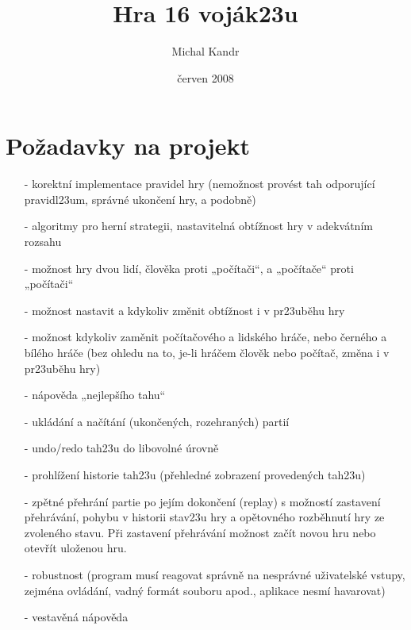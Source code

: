 \documentclass{article}
\title{Hra 16 voj\'ak\accent23u}
\author{Michal Kandr}
\date{\v{c}erven 2008}
\begin{document}
 \maketitle


\newpage



\section{Po\v{z}adavky na projekt}
\begin{enumerate}
	\item[-]korektn\'i implementace pravidel hry (nemo\v{z}nost prov\'est tah odporuj\'ic\'i pravidl\accent23um, spr\'avn\'e ukon\v{c}en\'i hry, a podobn\v{e})
	\item[-]algoritmy pro hern\'i strategii, nastaviteln\'a obt\'i\v{z}nost hry v adekv\'atn\'im rozsahu
	\item[-]mo\v{z}nost hry dvou lid\'i, \v{c}lov\v{e}ka proti „po\v{c}\'ita\v{c}i“, a „po\v{c}\'ita\v{c}e“ proti „po\v{c}\'ita\v{c}i“
	\item[-]mo\v{z}nost nastavit a kdykoliv zm\v{e}nit obt\'i\v{z}nost i v pr\accent23ub\v{e}hu hry
	\item[-]mo\v{z}nost kdykoliv zam\v{e}nit po\v{c}\'ita\v{c}ov\'eho a lidsk\'eho hr\'a\v{c}e, nebo \v{c}ern\'eho a b\'il\'eho hr\'a\v{c}e (bez ohledu na to, je-li hr\'a\v{c}em \v{c}lov\v{e}k nebo po\v{c}\'ita\v{c}, zm\v{e}na i v pr\accent23ub\v{e}hu hry)
	\item[-]n\'apov\v{e}da „nejlep\v{s}\'iho tahu“
	\item[-]ukl\'ad\'an\'i a na\v{c}\'it\'an\'i (ukon\v{c}en\'ych, rozehran\'ych) parti\'i
	\item[-]undo/redo tah\accent23u do libovoln\'e \'urovn\v{e}
	\item[-]prohl\'i\v{z}en\'i historie tah\accent23u (p\v{r}ehledn\'e zobrazen\'i proveden\'ych tah\accent23u)
	\item[-]zp\v{e}tn\'e p\v{r}ehr\'an\'i partie po jej\'im dokon\v{c}en\'i (replay) s mo\v{z}nost\'i zastaven\'i p\v{r}ehr\'av\'an\'i, pohybu v historii stav\accent23u hry a op\v{e}tovn\'eho rozb\v{e}hnut\'i hry ze zvolen\'eho stavu. P\v{r}i zastaven\'i p\v{r}ehr\'av\'an\'i mo\v{z}nost za\v{c}\'it novou hru nebo otev\v{r}\'it ulo\v{z}enou hru.
	\item[-]robustnost (program mus\'i reagovat spr\'avn\v{e} na nespr\'avn\'e u\v{z}ivatelsk\'e vstupy, zejm\'ena ovl\'ad\'an\'i, vadn\'y form\'at souboru apod., aplikace nesm\'i havarovat)
	\item[-]vestav\v{e}n\'a n\'apov\v{e}da

\end{enumerate}
\end{document}
